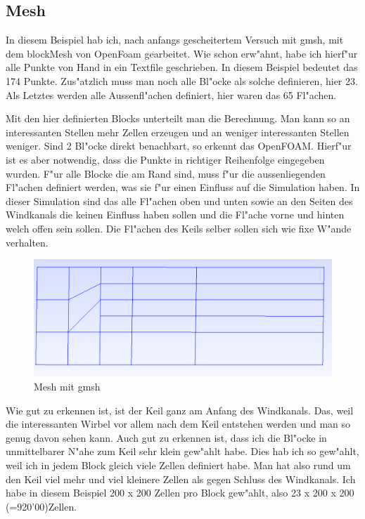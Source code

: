 \begin{refsection}
\subsection{Mesh}
In diesem Beispiel hab ich, nach anfangs gescheitertem Versuch mit gmsh,
mit dem blockMesh von OpenFoam gearbeitet. Wie schon erw"ahnt, habe ich
hierf"ur alle Punkte von Hand in ein Textfile geschrieben. In diesem
Beispiel bedeutet das 174 Punkte. Zus"atzlich muss man noch alle Bl"ocke
als solche definieren, hier 23. Als Letztes werden alle Aussenfl"achen
definiert, hier waren das 65 Fl"achen.

Mit den hier definierten Blocks unterteilt man die Berechnung. Man
kann so an interessanten Stellen mehr Zellen erzeugen und an weniger
interessanten Stellen weniger. Sind 2 Bl"ocke direkt benachbart, so
erkennt das OpenFOAM. Hierf"ur ist es aber notwendig, dass die Punkte
in richtiger Reihenfolge eingegeben wurden. F"ur alle Blocke die am
Rand sind, muss f"ur die aussenliegenden Fl"achen definiert werden, was
sie f"ur einen Einfluss auf die Simulation haben. In dieser Simulation
sind das alle Fl"achen oben und unten sowie an den Seiten des Windkanals
die keinen Einfluss haben sollen und die Fl"ache vorne und hinten welch
offen sein sollen. Die Fl"achen des Keils selber sollen sich wie fixe
W"ande verhalten.
\begin{figure}
\begin{center}
\includegraphics[scale = 0.2]{./openfoam/pics/Keil.png}
\end{center}
\caption{Mesh mit gmsh}
\end{figure}

Wie gut zu erkennen ist, ist der Keil ganz am Anfang des Windkanals. Das,
weil die interessanten Wirbel vor allem nach dem Keil entstehen werden
und man so genug davon sehen kann. Auch gut zu erkennen ist, dass ich die
Bl"ocke in unmittelbarer N"ahe zum Keil sehr klein gew"ahlt habe. Dies hab
ich so gew"ahlt, weil ich in jedem Block gleich viele Zellen definiert
habe. Man hat also rund um den Keil viel mehr und viel kleinere Zellen
als gegen Schluss des Windkanals. Ich habe in diesem Beispiel 200 x 200
Zellen pro Block gew"ahlt, also 23 x 200 x 200 (=920'00)Zellen.


\end{refsection}
